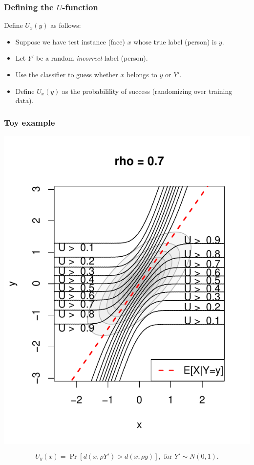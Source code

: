 \documentclass{beamer}
\begin{document}
\begin{frame}
\frametitle{Defining the $U$-function}
Define $U_x(y)$ as follows:
\begin{itemize}
\item Suppose we have test instance (face) $x$ whose true label (person) is $y$.
\item Let $Y'$ be a random \emph{incorrect} label (person).
\item Use the classifier to guess whether $x$ belongs to $y$ or $Y'$.
\item Define $U_x(y)$ as the probabilility of success (randomizing over training data).
\end{itemize}
\end{frame}

\begin{frame}
\frametitle{Toy example}
\begin{center}
\includegraphics[scale = 0.5]{../extrapolation/illus_ufunc_0_7.pdf}
\end{center}
\[
U_y(x) = \Pr[d(x, \rho Y') > d(x, \rho y)],\text{ for }Y' \sim N(0,1).
\]
\end{frame}
\end{document}
